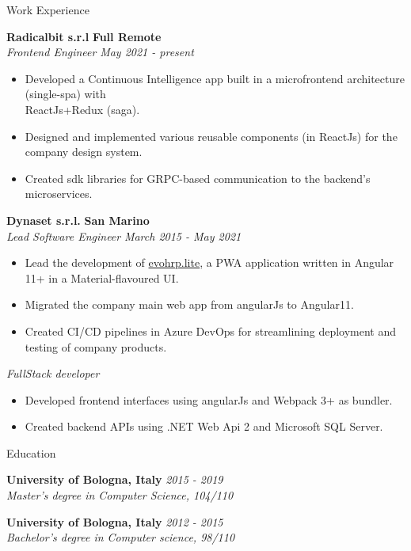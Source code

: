 \documentclass{resume} %
\begin{document}
\begin{rSection}{Work Experience}

  {\bf Radicalbit s.r.l} \hfill {\bf Full Remote}
  \\{\textit{Frontend Engineer}} \hfill {\em May 2021 - present}
  \begin{itemize}
    \item Developed a Continuous Intelligence app built in a
    microfrontend architecture (single-spa) with \\ ReactJs+Redux (saga).
    \item Designed and implemented various reusable components (in ReactJs) for the
    company design system.
    \item Created sdk libraries for GRPC-based communication to the
    backend's microservices.
  \end{itemize}
  {\bf Dynaset s.r.l.} \hfill  {\bf San Marino}
  \\{\textit{Lead Software Engineer}} \hfill {\em  March 2015 - May 2021}
  \begin{itemize}
    \item Lead the development of
    \href{https://evohrplite.app/}{evohrp.lite}, a PWA application written in Angular 11+ in a Material-flavoured UI.
    \item Migrated the company main web app from angularJs to Angular11.
    \item Created CI/CD pipelines in Azure DevOps for streamlining deployment and testing of company products.
  \end{itemize}
  {\textit{FullStack developer}}
  \begin{itemize}
    \item Developed frontend interfaces using angularJs and Webpack 3+ as bundler.
    \item Created backend APIs using .NET Web Api 2 and Microsoft SQL Server.
  \end{itemize}
  
\end{rSection}

\begin{rSection}{Education}

{\bf University of Bologna, Italy } \hfill {\em 2015 - 2019} 
\\{ \textit {Master's degree in Computer Science, 104/110 }} 

{\bf University of Bologna, Italy } \hfill {\em 2012 - 2015} 
\\ { \textit {Bachelor's degree in Computer science, 98/110 }} \hfill


\end{rSection}
\end{document}
